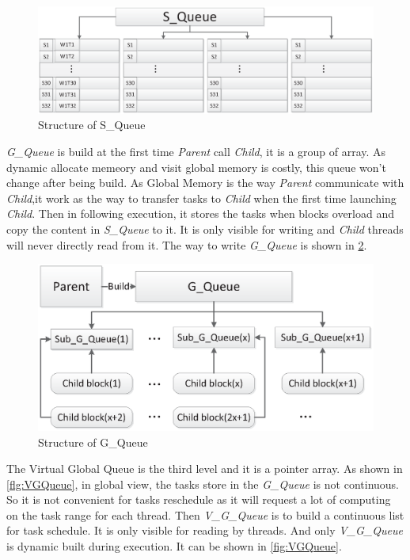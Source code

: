 \documentclass{llncs}
\begin{document}
\begin{figure}[htbp]
    \includegraphics[width=\textwidth]{SQueue.eps}
    \caption{Structure of S\_Queue}
    \label{fig:SQueue}
\end{figure}

\textsl{G\_Queue} is build at the first time \textsl{Parent} call \textsl{Child}, it is a group of array. As dynamic allocate memeory and visit global memory is costly, this queue won't change after being build. As Global Memory is the way \textsl{Parent} communicate with \textsl{Child},it work as the way to transfer tasks to \textsl{Child} when the first time launching \textsl{Child}. Then in following execution, it stores the tasks when blocks overload and copy the content in \textsl{S\_Queue} to it. It is only visible for writing and \textsl{Child} threads will never directly read from it. The way to write \textsl{G\_Queue} is shown in \ref{fig:GQueue}.

\begin{figure}[htbp]
    \includegraphics[width=\textwidth]{GQueue.eps}
	\caption{Structure of G\_Queue}
	\label{fig:GQueue}
\end{figure}

The Virtual Global Queue is the third level and it is a pointer array. As shown in \ref{flg:VGQueue}, in global view, the tasks store in the \textsl{G\_Queue} is not continuous. So it is not convenient for tasks reschedule as it will request a lot of computing on the task range for each thread. Then \textsl{V\_G\_Queue} is to build a continuous list for task schedule. It is only visible for reading by threads. And only \textsl{V\_G\_Queue} is dynamic built during execution. It can be shown in \ref{fig:VGQueue}.
\end{document}
